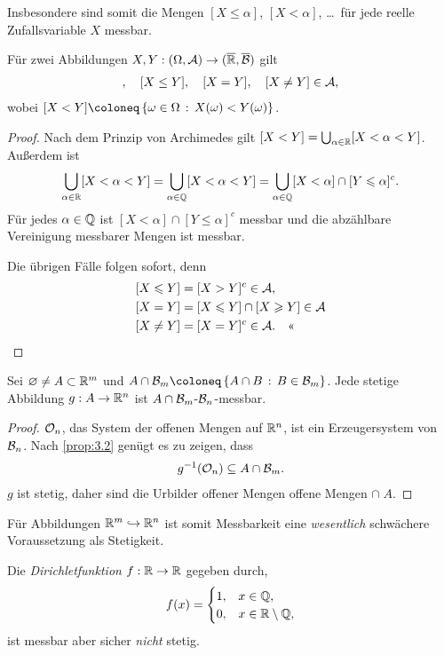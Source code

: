 Insbesondere sind somit die Mengen $[X\le \alpha]$, $[X<\alpha]$, \ldots\ für
jede reelle Zufallsvariable $X$ messbar.

\begin{cor}
\label{cor:3.1}
Für zwei Abbildungen $X,Y : (\Omega, \AA)\to
(\overline{\R}, \overline{\BB})$ gilt
\begin{align*}
[X< Y], \quad 
[X\leq Y], \quad 
[X = Y], \quad 
[X \neq Y] \in \AA,
\end{align*}
wobei $[X<Y]\defl \setdef{\omega \in \Omega}{X(\omega) < Y(\omega )}$.\fishhere
\end{cor}
\begin{proof}
Nach dem Prinzip von Archimedes gilt
$[X<Y]=\bigcup_{\alpha\in\R} [X<\alpha < Y]$. Außerdem ist
\begin{align*}
\bigcup_{\alpha\in\R} [X<\alpha < Y] = \bigcup_{\alpha\in\Q} [X<\alpha <
Y] = \bigcup_{\alpha\in\Q} [X<\alpha] \cap [Y\le \alpha]^c.
\end{align*}
Für jedes $\alpha\in\Q$ ist $[X<\alpha] \cap [Y\le \alpha]^c$ messbar und die abzählbare
Vereinigung messbarer Mengen ist messbar.

Die übrigen Fälle folgen sofort, denn
\begin{align*}
&[X\le Y] = [X>Y]^c \in \AA,\\
&[X=Y] = [X\le Y]\cap [X\ge Y]\in \AA\\
&[X\neq Y] = [X=Y]^c \in \AA.\qedhere
\end{align*}
\end{proof}

\begin{prop}
\label{prop:3.4}
Sei $\varnothing \neq A \subset \R^{m}$ und $A \cap {\BB}_{m} \defl
\setdef{A \cap B}{B\in {\BB}_{m}}$. Jede stetige Abbildung $g: A \to
\R^{n}$ ist $A \cap {\BB}_{m}$-${\BB}_{n}$-messbar.\fishhere
\end{prop}
\begin{proof}
$\OO_n$, das System der offenen Mengen auf $\R^n$, ist ein
Erzeugersystem von $\BB_n$. Nach \ref{prop:3.2} genügt es  zu
zeigen, dass
\begin{align*}
g^{-1}(\OO_n) \subseteq A\cap\BB_m.
\end{align*} 
$g$ ist stetig, daher sind die Urbilder offener Mengen offene Mengen
$\cap\; A$.\qedhere
\end{proof}

Für Abbildungen $\R^m\opento\R^n$ ist somit Messbarkeit eine \textit{wesentlich}
schwächere Voraussetzung als Stetigkeit.
\begin{bsp}
Die \emph{Dirichletfunktion} $f: \R\to\R$ gegeben durch,
\begin{align*}
f(x) = 
\begin{cases}
1, & x\in\Q,\\
0, & x\in\R\setminus\Q,
\end{cases}
\end{align*}
ist messbar aber sicher \textit{nicht} stetig.\bsphere
\end{bsp}

